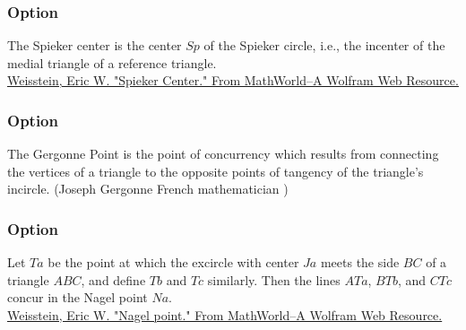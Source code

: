 \subsubsection{Option }
The Spieker center is the center $Sp$ of the Spieker circle, i.e., the incenter of the medial triangle of a reference triangle.\\
\href{https://mathworld.wolfram.com/SpiekerCenter.html}{Weisstein, Eric W. "Spieker Center." From MathWorld--A Wolfram Web Resource. }

\begin{tkzexample}[latex=8cm,small]
\end{tkzexample}

\subsubsection{Option }

The Gergonne Point is the point of concurrency which results from connecting the vertices of a triangle to the opposite points of tangency of the triangle's incircle.
(Joseph Gergonne French mathematician )

\begin{tkzexample}[latex=8cm,small]
\end{tkzexample}

\subsubsection{Option }
Let $Ta$ be the point at which the excircle with center $Ja$ meets the side $BC$ of a triangle $ABC$, and define $Tb$ and $Tc$ similarly. Then the lines $ATa$, $BTb$, and $CTc$ concur in the Nagel point $Na$.\\
\href{https://mathworld.wolfram.com/NagelPoint.html}{Weisstein, Eric W. "Nagel point." From MathWorld--A Wolfram Web Resource. }


